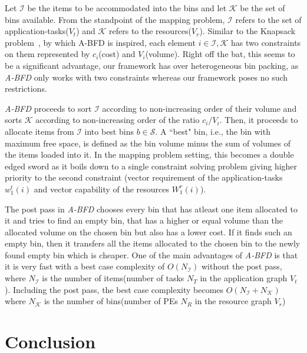 \documentclass[10pt, conference, compsocconf]{IEEEtran}
\begin{document}
Let $\mathcal{I}$ be the items to be accommodated into the bins and let $\mathcal{K}$ be the set of bins available.
From the standpoint of the mapping problem, $\mathcal{I}$ refers to the set of
application-tasks($V_t$) and $\mathcal{K}$ refers to the resources($V_r$). Similar to
the Knapsack problem~\cite{knapsack}, by which A-BFD is inspired, each
element $i \in \mathcal{I}, \mathcal{K}$ has two constraints on them represented
by $c_i$(cost) and $V_i$(volume). Right off the bat, this seems to be a significant 
advantage, our framework has over heterogeneous bin packing, as \textit{A-BFD} only
works with two constraints whereas our framework poses no such restrictions.

\textit{A-BFD} proceeds to sort $\mathcal{I}$ according to non-increasing order
of their volume and sorts $\mathcal{K}$ according to non-increasing order of the
ratio $c_i/V_i$. Then, it proceeds to allocate items from $\mathcal{I}$ into
best bins $b \in \mathcal{S}$. A ``best" bin, i.e., the bin with maximum free
space, is defined as the bin volume minus the sum of volumes of the items loaded
into it. In the mapping problem setting, this becomes a double edged sword as it
boils down to a single constraint solving problem giving higher priority to
the second constraint (vector requirement of the application-tasks $w^t_1(i)$ and
vector capability of the resources $W^r_1(i)$). 

The post pass in \textit{A-BFD} chooses every bin that has atleast one item
allocated to it and tries to find an empty bin, that has a higher or equal volume
than the allocated volume on the chosen bin but also has a lower cost. If it
finds such an empty bin, then it transfers all the items allocated to the chosen
bin to the newly found empty bin which is cheaper. One of the main advantages of
\textit{A-BFD} is that it is very fast with a best case complexity of
$O(N_\mathcal{I})$ without the post pass, where $N_\mathcal{I}$ is the number of
items(number of tasks $N_T$ in the application graph $V_t$). Including the post
pass, the best case complexity becomes $O(N_\mathcal{I} + N_\mathcal{K})$ where
$N_\mathcal{K}$ is the number of bins(number of PEs $N_R$ in the resource graph
$V_r$)

\section{Conclusion}






\scriptsize{

% 

}

\end{document}
